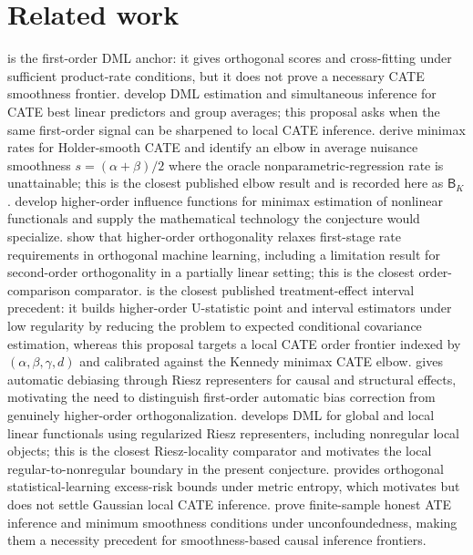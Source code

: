 \documentclass[11pt]{article}
\theoremstyle{definition}
\theoremstyle{plain}
\theoremstyle{remark}
\begin{document}
\section{Related work}
\citet[\S3]{ChernozhukovEtAl2018DML} is the first-order DML anchor: it gives
orthogonal scores and cross-fitting under sufficient product-rate conditions,
but it does not prove a necessary CATE smoothness frontier.  \citet{SemenovaChernozhukov2021DMLCATE}
develop DML estimation and simultaneous inference for CATE best linear
predictors and group averages; this proposal asks when the same first-order
signal can be sharpened to local CATE inference.  \citet[\S2--\S4 and Theorems 1--2]{KennedyBalakrishnanRobinsWasserman2024MinimaxCATE}
derive minimax rates for Holder-smooth CATE and identify an elbow in average
nuisance smoothness \(s=(\alpha+\beta)/2\) where the oracle
nonparametric-regression rate is unattainable; this is the closest published
elbow result and is recorded here as \(\mathsf B_K\).
\citet{RobinsLiTchetgenVanDerVaart2008HOIF}
develop higher-order influence functions for minimax estimation of nonlinear
functionals and supply the mathematical technology the conjecture would
specialize.  \citet[\S2.1, \S3.1, Corollary 4]{MackeySyrgkanisZadik2018OML} show that higher-order
orthogonality relaxes first-stage rate requirements in orthogonal machine
learning, including a limitation result for second-order orthogonality in a
partially linear setting; this is the closest order-comparison comparator.
\citet{LiTchetgenVanDerVaartRobins2011HOIFTreatment} is the closest published
treatment-effect interval precedent: it builds higher-order U-statistic point
and interval estimators under low regularity by reducing the problem to
expected conditional covariance estimation, whereas this proposal targets a
local CATE order frontier indexed by \((\alpha,\beta,\gamma,d)\) and calibrated
against the Kennedy minimax CATE elbow.
\citet{ChernozhukovNeweySingh2022AutoDML} gives automatic debiasing through
Riesz representers for causal and structural effects, motivating the need to
distinguish first-order automatic bias correction from genuinely higher-order
orthogonalization.  \citet[\S2--\S3]{ChernozhukovNeweySingh2022Riesz} develops DML for
global and local linear functionals using regularized Riesz representers,
including nonregular local objects; this is the closest Riesz-locality
comparator and motivates the local regular-to-nonregular boundary in the
present conjecture.  \citet{FosterSyrgkanis2023OSL} provides orthogonal
statistical-learning excess-risk bounds under metric entropy, which motivates
but does not settle Gaussian local CATE inference.  \citet{ArmstrongKolesar2021FiniteSampleATE}
prove finite-sample honest ATE inference and minimum smoothness conditions
under unconfoundedness, making them a necessity precedent for smoothness-based
causal inference frontiers.
\end{document}
